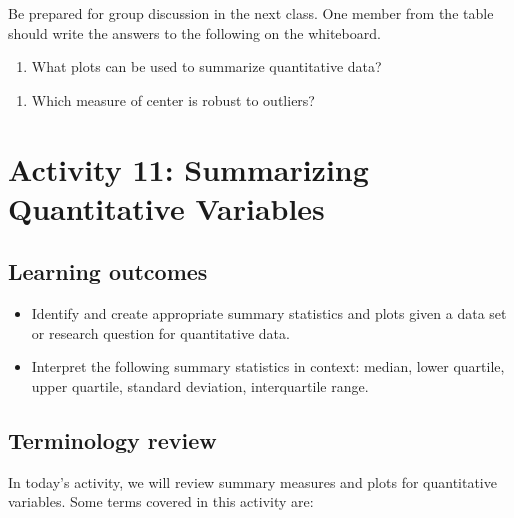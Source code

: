 \documentclass[
]{report}
\providecommand{\tightlist}{%
  \setlength{\itemsep}{0pt}\setlength{\parskip}{0pt}}
\begin{document}
Be prepared for group discussion in the next class. One member from the table should write the answers to the following on the whiteboard.

\begin{enumerate}
\def\labelenumi{\arabic{enumi}.}
\tightlist
\item
  What plots can be used to summarize quantitative data?
\end{enumerate}

\vspace{0.7in}

\begin{enumerate}
\def\labelenumi{\arabic{enumi}.}
\setcounter{enumi}{1}
\tightlist
\item
  Which measure of center is robust to outliers?
\end{enumerate}

\vspace{0.2in}

\newpage

\section{Activity 11: Summarizing Quantitative Variables}\label{activity-11-summarizing-quantitative-variables}


\subsection{Learning outcomes}\label{learning-outcomes}

\begin{itemize}
\item
  Identify and create appropriate summary statistics and plots given a data set or research question for quantitative data.
\item
  Interpret the following summary statistics in context:
  median, lower quartile, upper quartile,
  standard deviation, interquartile range.
\end{itemize}

\subsection{Terminology review}\label{terminology-review}

In today's activity, we will review summary measures and plots for quantitative variables. Some terms covered in this activity are:
\end{document}
